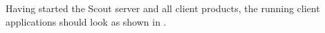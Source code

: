 Having started the Scout server and all client products, the running client applications should look as shown in .

